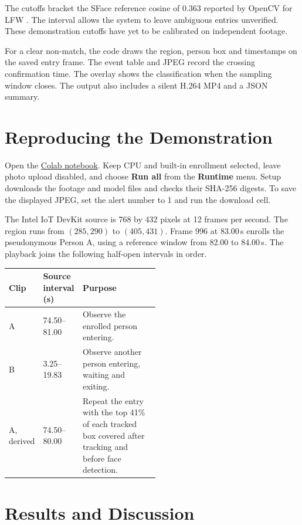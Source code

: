 \documentclass[11pt,a4paper]{article}
\begin{document}
The cutoffs bracket the SFace reference cosine of 0.363 reported by OpenCV for LFW \cite{opencv}. The interval allows the system to leave ambiguous entries unverified. These demonstration cutoffs have yet to be calibrated on independent footage.

For a clear non-match, the code draws the region, person box and timestamps on the saved entry frame. The event table and JPEG record the crossing confirmation time. The overlay shows the classification when the sampling window closes. The output also includes a silent H.264 MP4 and a JSON summary.

\section{Reproducing the Demonstration}

Open the \href{https://colab.research.google.com/github/guna2007/CV_finalised_repo/blob/main/face_aware_tripwire.ipynb}{Colab notebook}. Keep CPU and built-in enrollment selected, leave photo upload disabled, and choose \textbf{Run all} from the \textbf{Runtime} menu. Setup downloads the footage and model files and checks their SHA-256 digests. To save the displayed JPEG, set the alert number to 1 and run the download cell.

The Intel IoT DevKit source \cite{intel} is 768 by 432 pixels at 12 frames per second. The region runs from \((285,290)\) to \((405,431)\). Frame 996 at 83.00\,s enrolls the pseudonymous Person A, using a reference window from 82.00 to 84.00\,s. The playback joins the following half-open intervals in order.

\begin{center}
\begin{tabular}{@{}llp{0.51\linewidth}@{}}
  \toprule
  Clip & Source interval (s) & Purpose \\
  \midrule
  A & 74.50--81.00 & Observe the enrolled person entering. \\
  B & 3.25--19.83 & Observe another person entering, waiting and exiting. \\
  A, derived & 74.50--80.00 & Repeat the entry with the top 41\% of each tracked box covered after tracking and before face detection. \\
  \bottomrule
\end{tabular}
\end{center}

\clearpage
\section{Results and Discussion}
\end{document}
